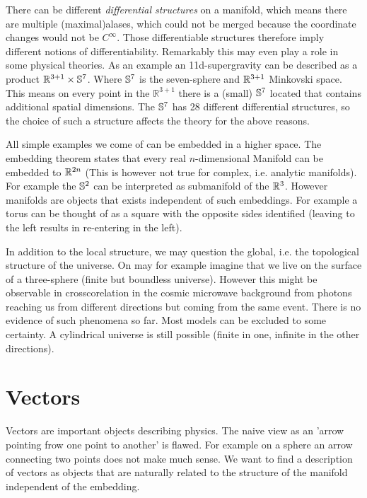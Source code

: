 \begin{sidenote}
There can be different \emph{differential structures} on a manifold, 
which means there are multiple (maximal)alases, which
could not be merged because the coordinate changes would not be $C^\infty$. Those differentiable structures therefore imply different notions of differentiability. 
Remarkably this may even play a role in some physical theories. 
As an example an 11d-supergravity can be described as a product
$\mathbb{R}^{3+1}\times \mathbb{S}^7$.
Where $\mathbb{S}^7$ is the seven-sphere and $\mathbb{R}^{3+1}$ Minkovski space.
This means on every point in the $\mathbb{R}^{3+1}$ there is a (small) $\mathbb{S}^7$  located that contains additional spatial dimensions. 
The $\mathbb{S}^7$ has 28 different differential structures, so the choice of
such a structure affects the theory for the above reasons.
\end{sidenote}
All simple examples we come of can be embedded in a higher space. The
 embedding theorem states that every real $n$-dimensional Manifold
can be embedded to $\mathbb{R}^{2n}$ (This is however not true for complex, i.e. analytic manifolds).
For example the $\mathbb{S}^2$ can be interpreted as submanifold of the $\mathbb{R}^3$.
However manifolds are objects that exists independent of such embeddings. 
For example a torus can be thought of as a square with the opposite sides identified (leaving to the left results in re-entering in the left).
\begin{sidenote}
In addition to the local structure, we may question the global, i.e. the
topological structure of the universe.
On may for example imagine that we live on the surface of a three-sphere (finite
but boundless universe).
However this might be observable in crosscorelation in the cosmic microwave background from photons reaching us 
from different directions but coming from the same event. There is no evidence of such phenomena so far. 
Most models can be excluded to some certainty. A cylindrical
universe is still possible (finite in one, infinite in the
other directions).
\end{sidenote}
\section{Vectors}
Vectors are important objects describing physics. The naive view as an 'arrow
pointing frow one point to another' is flawed.
For example on a sphere an arrow connecting two points does not make much sense.
We want to find a description of vectors as objects that are naturally related to the structure of the manifold independent of the embedding.
